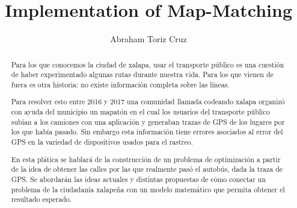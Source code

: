 \documentclass[10pt,letterpaper]{article}
\author{Abraham Toriz Cruz}
\title{Implementation of Map-Matching}
\begin{document}
\maketitle

\begin{abstract}
Para los que conocemos la ciudad de xalapa, usar el transporte público es una cuestión de haber experimentado algunas rutas durante nuestra vida. Para los que vienen de fuera es otra historia: no existe información completa sobre las líneas.

Para resolver esto entre 2016 y 2017 una comunidad llamada codeando xalapa organizó con ayuda del municipio un mapatón en el cual los usuarios del transporte público subían a los camiones con una aplicación y generaban trazas de GPS de los lugares por los que había pasado. Sin embargo esta información tiene errores asociados al error del GPS en la variedad de dispositivos usados para el rastreo.

En esta plática se hablará de la construcción de un problema de optimización a partir de la idea de obtener las calles por las que realmente pasó el autobús, dada la traza de GPS. Se abordarán las ideas actuales y distintas propuestas de cómo conectar un problema de la ciudadanía xalapeña con un modelo matemático que permita obtener el resultado esperado.
\end{abstract}
\end{document}
